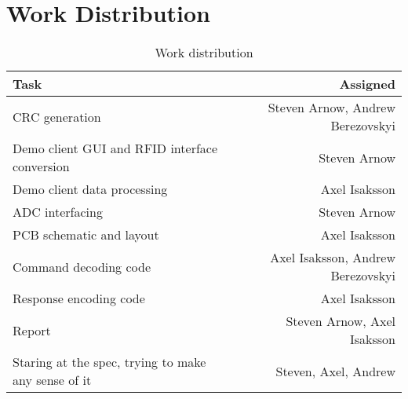 \section{Work Distribution}
\begin{table}[h]
\centering
\begin{tabular}{| l | r |}
	\hline
	Task & Assigned \\\hline
	CRC generation & Steven Arnow, Andrew Berezovskyi \\ \hline
	Demo client GUI and RFID interface conversion & Steven Arnow \\ \hline
	Demo client data processing & Axel Isaksson \\ \hline
	ADC interfacing & Steven Arnow \\\hline
	
	PCB schematic and layout & Axel Isaksson \\\hline
	Command decoding code & Axel Isaksson, Andrew Berezovskyi \\\hline
	Response encoding code & Axel Isaksson \\\hline
	
	Report & Steven Arnow, Axel Isaksson \\ \hline
	Staring at the spec, trying to make any sense of it & Steven, Axel, Andrew \\ \hline
	
	\hline
\end{tabular}
\caption{Work distribution}
\label{tab:work}
\end{table}
